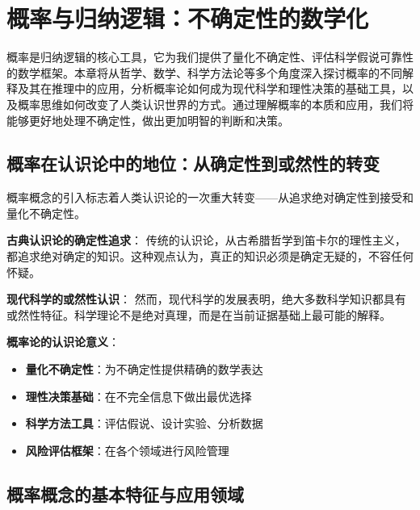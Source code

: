 \section{概率与归纳逻辑：不确定性的数学化}

\begin{logicbox}[title=引言]
概率是归纳逻辑的核心工具，它为我们提供了量化不确定性、评估科学假说可靠性的数学框架。本章将从哲学、数学、科学方法论等多个角度深入探讨概率的不同解释及其在推理中的应用，分析概率论如何成为现代科学和理性决策的基础工具，以及概率思维如何改变了人类认识世界的方式。通过理解概率的本质和应用，我们将能够更好地处理不确定性，做出更加明智的判断和决策。
\end{logicbox}

\subsection{概率在认识论中的地位：从确定性到或然性的转变}

\begin{theorembox}[title=概率概念的认识论革命]
概率概念的引入标志着人类认识论的一次重大转变——从追求绝对确定性到接受和量化不确定性。

\textbf{古典认识论的确定性追求}：
传统的认识论，从古希腊哲学到笛卡尔的理性主义，都追求绝对确定的知识。这种观点认为，真正的知识必须是确定无疑的，不容任何怀疑。

\textbf{现代科学的或然性认识}：
然而，现代科学的发展表明，绝大多数科学知识都具有或然性特征。科学理论不是绝对真理，而是在当前证据基础上最可能的解释。

\textbf{概率论的认识论意义}：
\begin{itemize}
\item \textbf{量化不确定性}：为不确定性提供精确的数学表达
\item \textbf{理性决策基础}：在不完全信息下做出最优选择
\item \textbf{科学方法工具}：评估假说、设计实验、分析数据
\item \textbf{风险评估框架}：在各个领域进行风险管理
\end{itemize}
\end{theorembox}

\subsection{概率概念的基本特征与应用领域}

